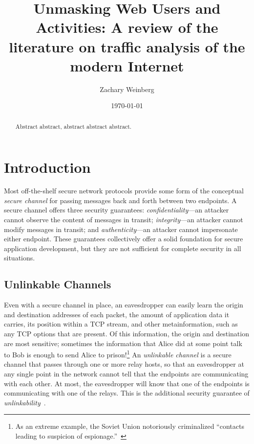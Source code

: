 \documentclass{zarticle}
\begin{document}
\title{Unmasking Web Users and Activities:
  A review of the literature on traffic analysis of the modern Internet}
\author{Zachary Weinberg}
\date{\today}
\maketitle

\begin{abstract}
Abstract abstract, abstract abstract abstract.
\end{abstract}

\section{Introduction}

Most off-the-shelf secure network protocols provide some form of the
conceptual \emph{secure channel} for passing messages back and forth
between two endpoints.  A secure channel offers three security
guarantees: \emph{confidentiality}---an attacker cannot observe the
content of messages in transit; \emph{integrity}---an attacker cannot
modify messages in transit; and \emph{authenticity}---an attacker
cannot impersonate either endpoint.  These guarantees collectively
offer a solid foundation for secure application development, but they
are not sufficient for complete security in all situations.

\subsection{Unlinkable Channels}

Even with a secure channel in place, an eavesdropper can easily learn
the origin and destination addresses of each packet, the amount of
application data it carries, its position within a TCP stream, and
other metainformation, such as any TCP options that are present.  Of
this information, the origin and destination are most sensitive;
sometimes the information that Alice did at some point talk to Bob is
enough to send Alice to prison!\footnote{As an extreme example, the
  Soviet Union notoriously criminalized “contacts leading to suspicion
  of espionage.”~\cite{solzh74gulag:svpsh}}  An \emph{unlinkable
  channel} is a secure channel that passes through one or more relay
hosts, so that an eavesdropper at any single point in the network
cannot tell that the endpoints are communicating with each other.  At
most, the eavesdropper will know that one of the endpoints is
communicating with one of the relays.  This is the additional security
guarantee of \emph{unlinkability}~\cite{pfitzmann2010terminology}.
\end{document}
